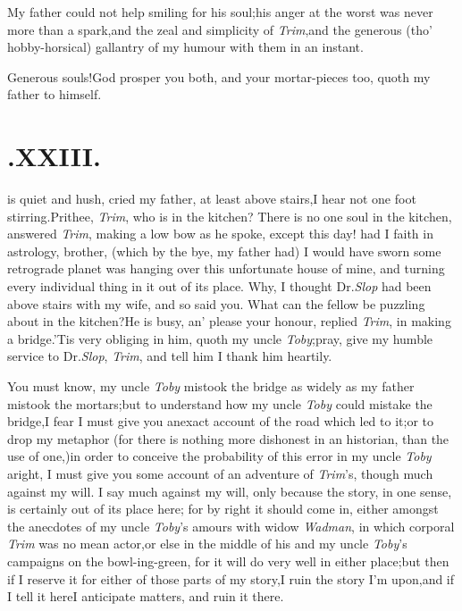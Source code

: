 \documentclass{article}
\begin{document}
My father could not help smiling for his soul;\tsk his anger at
the worst was ne\-ver more than a spark,\tsk and the zeal and
simplicity of \textit{Trim},\tsh and the generous
(tho’ hobby-horsical) gallantry of my\break 
{}
humour with them in an instant.

Generous souls!\tsk God prosper you both, and your mortar-pieces
too, quoth my father to himself.

\null
\section{.\quad  XXIII.}

 is quiet and hush, cried my\break
father, at least above stairs,\tsk I\break
hear not one foot stirring.\tsh Prithee, \textit{Trim}, who is in
the kitchen?  There is no one soul in the kitchen, answered
\textit{Trim}, making a low bow as he spoke, except
this day! had I faith in astrology, bro\-ther, (which by
the bye, my father had)
I would have sworn some retrograde pla\-net was hanging over this
unfortunate house of mine, and turning every individual thing in
it out of its place.\tsh\break
Why, I thought Dr.\@ \textit{Slop} had been above stairs with my
wife, and so said you.\tsh\break
What can the fellow be puzzling about
in the kitchen?\tsk He is busy, an’ please your honour, replied
\textit{Trim}, in making a bridge.\tsh ’Tis very obliging in
him, quoth my uncle \textit{Toby};\tsh pray, give my humble
service to Dr.\@ \textit{Slop}, \textit{Trim}, and tell him I
thank him heartily.

You must know, my uncle \textit{Toby} mistook the bridge as
widely as my father mistook the mortars;\tsh but to
under\-stand how my uncle \textit{Toby} could mistake the
bridge,\tsk I fear I must give you an\break exact account of the road
which led to it;\tsk or to drop my metaphor (for
there is nothing more dishonest in an historian, than the use of
one,)\tsh in order to conceive the probability of this error in
my uncle \textit{Toby} aright, I must give you some account of
an adventure of \textit{Trim}’s, though much against my will. I
say much against my will, only because the story, in one sense,
is certainly out of its place here; for by right it should come
in, either amongst the anecdotes of my uncle \textit{Toby}’s
amours with widow \textit{Wadman}, in which corporal
\textit{Trim} was no mean actor,\tsk or else in the middle of his
and my uncle \textit{Toby}’s campaigns on the bowl-\break ing-green,\tsk
for it will do very well in either place;\tsk but then if I
reserve it for either of those parts of my story,\tsh I ruin the
story I’m upon,\tsk and if I tell it here\tsk I anticipate
matters, and ruin it there.
\end{document}
